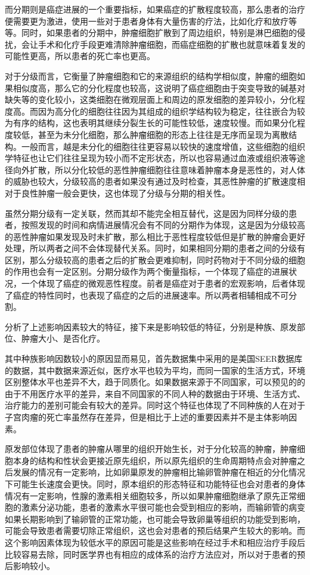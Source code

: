 而分期则是癌症进展的一个重要指标，如果癌症的扩散程度较高，那么患者的治疗便需要更为激进，使用一些对于患者身体有大量伤害的疗法，比如化疗和放疗等等。同时，如果患者的分期中，肿瘤细胞扩散到了周边组织，特别是淋巴细胞的侵扰，会让手术和化疗手段更难清除肿瘤细胞，而癌症细胞的扩散也就意味着复发的可能性更高，所以患者的死亡率也更高。

对于分级而言，它衡量了肿瘤细胞和它的来源组织的结构学相似度，肿瘤的细胞如果相似度高，那么它的分化程度也较高，这说明了癌症细胞由于突变导致的碱基对缺失等的变化较小，这类细胞在微观层面上和周边的原发细胞的差异较小，分化程度高。而因为高分化的细胞往往因为其组成的组织学结构较为稳定，往往嵌合为较为有序的结构，这也表明其继续分裂生长的可能性较低，速度较慢。而如果分化程度较低，甚至为未分化细胞，那么肿瘤细胞的形态上往往是无序而呈现为离散结构。一般而言，越是未分化的细胞往往更容易以较快的速度增值，这些细胞的组织学特征也让它们往往呈现为较小而不定形状态，所以也容易通过血液或组织液等途径向外扩散，所以分化较低的恶性肿瘤细胞往往意味着肿瘤本身是恶性的，对人体的威胁也较大，分级较高的患者如果没有通过及时检查，其恶性肿瘤的扩散速度相对于良性肿瘤一般会更快，这也体现了分级与分期的相关性。

虽然分期分级有一定关联，然而其却不能完全相互替代，这是因为同样分级的患者，按照发现的时间和病情进展情况会有不同的分期作为体现，这是因为分级较高的恶性肿瘤如果发现及时未扩散，那么相比于恶性程度较低但是扩散的肿瘤会更好处理，所以两者之间不会体现替代关系。同时，如果相同分期的患者之间的分级有区别，那么分级较高的患者之后的扩散会更难抑制，同时药物对于不同分级的细胞的作用也会有一定区别。分期分级作为两个衡量指标，一个体现了癌症的进展状况，一个体现了癌症的微观恶性程度。前者是癌症对于患者的宏观影响，后者体现了癌症的特性同时，也表现了癌症的之后的进展速率。所以两者相辅相成不可分割。

分析了上述影响因素较大的特征，接下来是影响较低的特征，分别是种族、原发部位、肿瘤大小、是否化疗。

其中种族影响因数较小的原因显而易见，首先数据集中采用的是美国SEER数据库的数据，其中数据来源近似，医疗水平也较为平均，而同一国家的生活方式，环境区别整体水平也差异不大，趋于同质化。如果数据来源于不同国家，可以预见的的由于不用医疗水平的差异，来自不同国家的不同人种的数据由于环境、生活方式、治疗能力的差别可能会有较大的差异。同时这个特征也体现了不同种族的人在对于子宫肉瘤的死亡率虽然存在差异，但是相比于上述的重要因素并不是主体影响因素。

原发部位体现了患者的肿瘤从哪里的组织开始生长，对于分化较高的肿瘤，肿瘤细胞本身的结构和性状会更接近原先组织，所以原先组织的生命周期特点会对肿瘤之后发展的情况有一定影响，比如卵巢原发的肿瘤相比输卵管肿瘤在相近的分化情况下可能生长速度会更快。同时，原本组织的形态特征和功能特征也会对患者的身体情况有一定影响，性腺的激素相关细胞较多，所以如果肿瘤细胞继承了原先正常细胞的激素分泌功能，患者的激素水平很可能也会受到相应的影响，而输卵管的病变如果长期影响到了输卵管的正常功能，也可能会导致卵巢等组织的功能受到影响，可能会导致患者需要切除正常组织，这也会对患者的预后结果产生较大的影响。而这个影响因素体现为较低水平的原因可能是这些影响在经过手术和相应治疗手段后比较容易去除，同时医学界也有相应的成体系的治疗方法应对，所以对于患者的预后影响较小。

